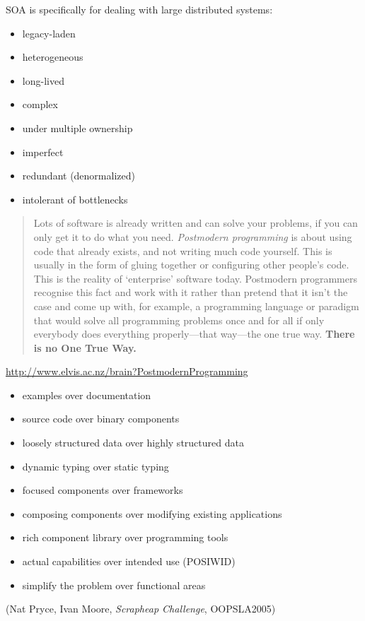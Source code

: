 \documentclass{sepslide-soa-faked} %
\begin{document}
\begin{slide}
SOA is specifically for dealing with large distributed systems:
\begin{itemize}
\item legacy-laden
\item heterogeneous
\item long-lived
\item complex
\item under multiple ownership
\item imperfect
\item redundant (denormalized)
\item intolerant of bottlenecks
\end{itemize}
\end{slide}

\begin{slide}
\begin{quote}
  Lots of software is already written and can solve your problems, if
  you can only get it to do what you need. \emph{Postmodern programming} is
  about using code that already exists, and not writing much code
  yourself. This is usually in the form of gluing together or
  configuring other people's code. This is the reality of `enterprise'
  software today. Postmodern programmers recognise this fact and work
  with it rather than pretend that it isn't the case and come up with,
  for example, a programming language or paradigm that would solve all
  programming problems once and for all if only everybody does
  everything properly---that way---the one true way. 
  \textbf{There is no One True Way.}
\end{quote}
\url{http://www.elvis.ac.nz/brain?PostmodernProgramming}
\end{slide}

\begin{slide}
\begin{itemize}
\item examples over documentation
\item source code over binary components
\item loosely structured data over highly structured data
\item dynamic typing over static typing
\item focused components over frameworks
\item composing components over modifying existing applications
\item rich component library over programming tools
\item actual capabilities over intended use (POSIWID)
\item simplify the problem over functional areas 
\end{itemize}
(Nat Pryce, Ivan Moore, \textit{Scrapheap Challenge}, OOPSLA2005)
\end{slide}
\end{document}
